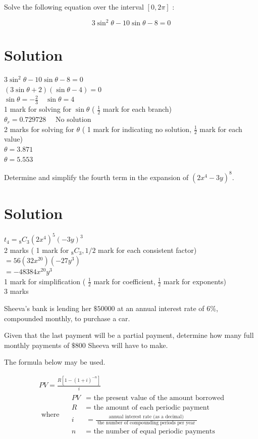 \documentclass[10pt]{article}
\begin{document}
Solve the following equation over the interval $[0,2 \pi]$ :

$$
3 \sin ^{2} \theta-10 \sin \theta-8=0
$$

\section*{Solution}
$3 \sin ^{2} \theta-10 \sin \theta-8=0$\\
$(3 \sin \theta+2)(\sin \theta-4)=0$\\
$\sin \theta=-\frac{2}{3} \quad \sin \theta=4$\\
1 mark for solving for $\sin \theta$ ( $\frac{1}{2}$ mark for each branch)\\
$\theta_{r}=0.729728 \quad$ No solution\\
2 marks for solving for $\theta$ ( 1 mark for indicating no solution, $\frac{1}{2}$ mark for each value)\\
$\theta=3.871$\\
$\theta=5.553$

Determine and simplify the fourth term in the expansion of $\left(2 x^{4}-3 y\right)^{8}$.

\section*{Solution}
$t_{4}={ }_{8} C_{3}\left(2 x^{4}\right)^{5}(-3 y)^{3}$\\
2 marks ( 1 mark for ${ }_{8} C_{3}, 1 / 2$ mark for each consistent factor)\\
$=56\left(32 x^{20}\right)\left(-27 y^{3}\right)$\\
$=-48384 x^{20} y^{3}$\\
1 mark for simplification ( $\frac{1}{2}$ mark for coefficient, $\frac{1}{2}$ mark for exponents)\\
3 marks

Sheeva's bank is lending her $\$ 50000$ at an annual interest rate of $6 \%$, compounded monthly, to purchase a car.

Given that the last payment will be a partial payment, determine how many full monthly payments of $\$ 800$ Sheeva will have to make.

The formula below may be used.

$$
\begin{aligned}
& P V=\frac{R\left[1-(1+i)^{-n}\right]}{i} \\
& \text { where } \quad \begin{aligned}
P V & =\text { the present value of the amount borrowed } \\
R & =\text { the amount of each periodic payment } \\
i & =\frac{\text { annual interest rate (as a decimal) }}{\text { the number of compounding periods per year }} \\
n & =\text { the number of equal periodic payments }
\end{aligned}
\end{aligned}
$$
\end{document}
